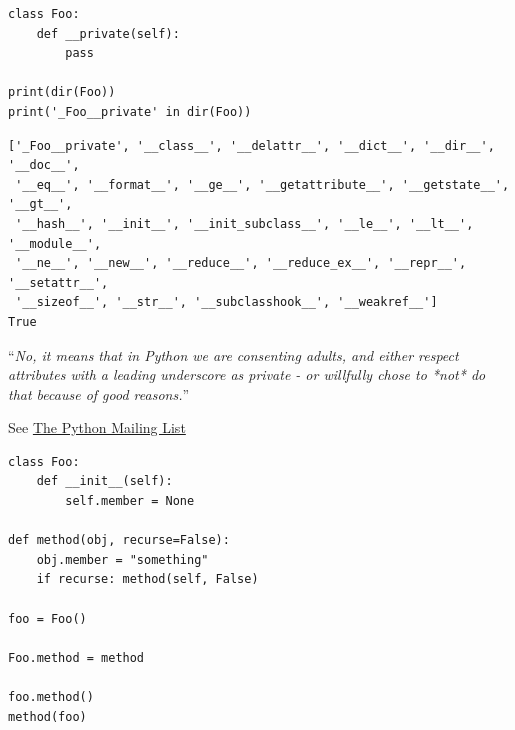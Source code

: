 
\begin{frame}[fragile]
%
\begin{codebox}
\begin{verbatim}
class Foo:
    def __private(self):
        pass

print(dir(Foo))
print('_Foo__private' in dir(Foo))
\end{verbatim}
\end{codebox}
%
\begin{cmdbox}[Output]
\begin{verbatim}
['_Foo__private', '__class__', '__delattr__', '__dict__', '__dir__', '__doc__', 
 '__eq__', '__format__', '__ge__', '__getattribute__', '__getstate__', '__gt__', 
 '__hash__', '__init__', '__init_subclass__', '__le__', '__lt__', '__module__', 
 '__ne__', '__new__', '__reduce__', '__reduce_ex__', '__repr__', '__setattr__', 
 '__sizeof__', '__str__', '__subclasshook__', '__weakref__']
True
\end{verbatim}
\end{cmdbox}
%
\end{frame}


\begin{frame}[fragile]
%
\vspace*{-2pt}
\begin{defbox}[Quote]
\footnotesize
\enquote{\emph{No, it means that in Python we are consenting adults, and either respect
attributes with a leading underscore as private - or willfully chose to
*not* do that because of good reasons.}}

See \href{https://mail.python.org/pipermail/python-list/2009-November.txt}{\thus The Python Mailing List}
\end{defbox}
%
\vspace*{-4pt}
\begin{codebox}
\begin{verbatim}
class Foo:
    def __init__(self):
        self.member = None

def method(obj, recurse=False):
    obj.member = "something"
    if recurse: method(self, False)

foo = Foo()

Foo.method = method

foo.method()
method(foo)
\end{verbatim}
\end{codebox}
%
\end{frame}

